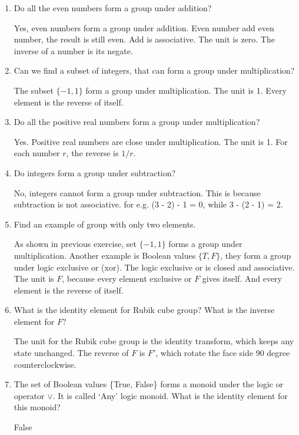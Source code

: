 \documentclass[UTF8]{article}
\begin{document}
\begin{enumerate}
\item {Do all the even numbers form a group under addition?}

Yes, even numbers form a group under addition. Even number add even number, the result is still even. Add is associative. The unit is zero. The inverse of a number is its negate.

\item {Can we find a subset of integers, that can form a group under multiplication?}

The subset $\{ -1, 1 \}$ form a group under multiplication. The unit is 1. Every element is the reverse of itself.

\item {Do all the positive real numbers form a group under multiplication?}

Yes. Positive real numbers are close under multiplication. The unit is 1. For each number $r$, the reverse is $1/r$.

\item {Do integers form a group under subtraction?}

No, integers cannot form a group under subtraction. This is because subtraction is not associative. for e.g. (3 - 2) - 1 = 0, while 3 - (2 - 1) = 2.

\item {Find an example of group with only two elements.}

As shown in previous exercise, set $\{-1, 1\}$ forms a group under multiplication. Another example is Boolean values $\{T, F\}$, they form a group under logic exclusive or (xor). The logic exclusive or is closed and associative. The unit is $F$, because every element exclusive or $F$ gives itself. And every element is the reverse of itself.

\item {What is the identity element for Rubik cube group? What is the inverse element for $F$?}

The unit for the Rubik cube group is the identity transform, which keeps any state unchanged. The reverse of $F$ is $F'$, which rotate the face side 90 degree counterclockwise.

\item {The set of Boolean values \{True, False\} forms a monoid under the logic or operator $\lor$. It is called `Any' logic monoid. What is the identity element for this monoid?}

False


\end{enumerate}
\end{document}
